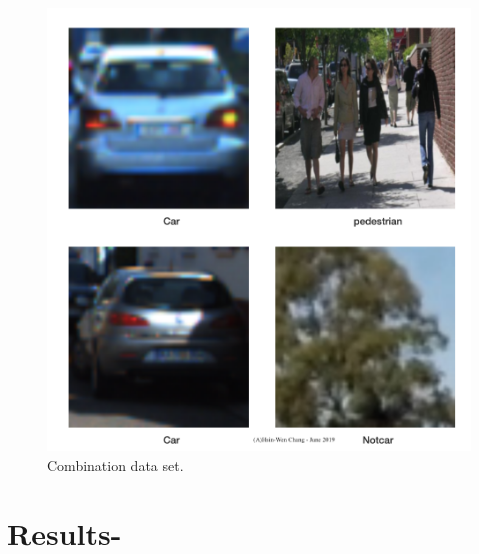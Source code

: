 \documentclass[10pt,journal,compsoc]{IEEEtran}
\begin{document}
\begin{figure}[thpb]
      \centering
      \includegraphics[width=\linewidth]{mixDataset.png}
      \caption{Combination data set.}
      \label{fig:robot1}
\end{figure}

\section{Results-}
\end{document}
